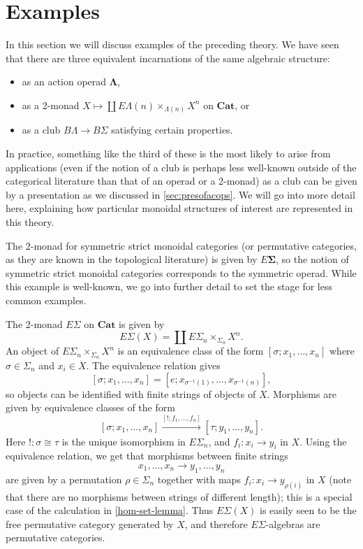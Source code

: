 \documentclass{amsbook} %
\newcommand{\mb}{\mathbf}
\numberwithin{section}{chapter}
\begin{document}
\section{Examples}\label{sec:examples}

In this section we will discuss examples of the preceding theory.  We have seen that there are three equivalent incarnations of the same algebraic structure:
\begin{itemize}
\item as an action operad $\mb{\Lambda}$,
\item as a 2-monad $X \mapsto \coprod E\Lambda(n) \times_{\Lambda(n)} X^{n}$ on $\mb{Cat}$, or
\item as a club $B\Lambda \rightarrow B\Sigma$ satisfying certain properties.
\end{itemize}
In practice, something like the third of these is the most likely to arise from applications (even if the notion of a club is perhaps less well-known outside of the categorical literature than that of an operad or a 2-monad) as a club can be given by a presentation as we discussed in \cref{sec:presofacops}.  We will go into more detail here, explaining how particular monoidal structures of interest are represented in this theory.


\begin{example}
The 2-monad for symmetric strict monoidal categories (or permutative categories, as they are known in the topological literature) is given by $E \mb{\Sigma}$, so the notion of symmetric strict monoidal categories corresponds to the symmetric operad.  While this example is well-known, we go into further detail to set the stage for less common examples.

The 2-monad $E\Sigma$ on $\mb{Cat}$ is given by
\[
E\Sigma (X) = \coprod E\Sigma_{n} \times_{\Sigma_{n}} X^{n}.
\]
An object of $E\Sigma_{n} \times_{\Sigma_{n}} X^{n}$ is an equivalence class of the form $[\sigma; x_{1}, \ldots, x_{n}]$ where $\sigma \in \Sigma_{n}$ and $x_{i} \in X$.  The equivalence relation gives
\[
[\sigma; x_{1}, \ldots, x_{n}] = [e; x_{\sigma^{-1}(1)}, \ldots, x_{\sigma^{-1}(n)}],
\]
so objects can be identified with finite strings of objects of $X$.  Morphisms are given by equivalence classes of the form
\[
[\sigma; x_{1}, \ldots, x_{n}] \stackrel{[!; f_{1}, \ldots, f_{n}]}{\longrightarrow} [\tau; y_{1}, \ldots, y_{n}].
\]
Here $!:\sigma \cong \tau$ is the unique isomorphism in $E \Sigma_{n}$, and $f_{i}:x_{i} \rightarrow y_{i}$ in $X$.  Using the equivalence relation, we get that morphisms between finite strings
\[
x_{1}, \ldots, x_{n} \rightarrow y_{1}, \ldots, y_{n}
\]
are given by a permutation $\rho \in \Sigma_{n}$ together with maps $f_{i}:x_{i} \rightarrow y_{\rho(i)}$ in $X$ (note that there are no morphisms between strings of different length); this is a special case of the calculation in \ref{hom-set-lemma}.  Thus $E \Sigma(X)$ is easily seen to be the free permutative category generated by $X$, and therefore $E \Sigma$-algebras are permutative categories.
\end{example}
\end{document}

